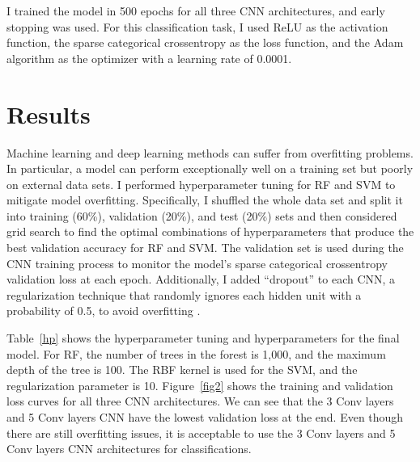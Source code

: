 \documentclass[letterpaper]{article} %
\begin{document}
I trained the model in 500 epochs for all three CNN architectures, and early stopping was used. For this classification task, I used ReLU as the activation function, the sparse categorical crossentropy as the loss function, and the Adam algorithm as the optimizer with a learning rate of 0.0001. 


\begin{table}[t]
\centering
{}
\caption{Hyperparameters tuning for random forest and support vector machine and hyperparameters for the final model}
\label{hp}
\end{table}

\section{Results}

Machine learning and deep learning methods can suffer from overfitting problems. In particular, a model can perform exceptionally well on a training set but poorly on external data sets. I performed hyperparameter tuning for RF and SVM to mitigate model overfitting. Specifically, I shuffled the whole data set and split it into training (60\%), validation (20\%), and test (20\%) sets and then considered grid search to find the optimal combinations of hyperparameters that produce the best validation accuracy for RF and SVM. The validation set is used during the CNN training process to monitor the model's sparse categorical crossentropy validation loss at each epoch. Additionally, I added ``dropout'' to each CNN, a regularization technique that randomly ignores each hidden unit with a probability of 0.5, to avoid overfitting \cite{hinton2012improving}. 



Table~\ref{hp} shows the hyperparameter tuning and hyperparameters for the final model. For RF, the number of trees in the forest is 1,000, and the maximum depth of the tree is 100. The RBF kernel is used for the SVM, and the regularization parameter is 10. Figure~\ref{fig2} shows the training and validation loss curves for all three CNN architectures. We can see that the 3 Conv layers and 5 Conv layers CNN have the lowest validation loss at the end. Even though there are still overfitting issues, it is acceptable to use the 3 Conv layers and 5 Conv layers CNN architectures for classifications.
\end{document}
